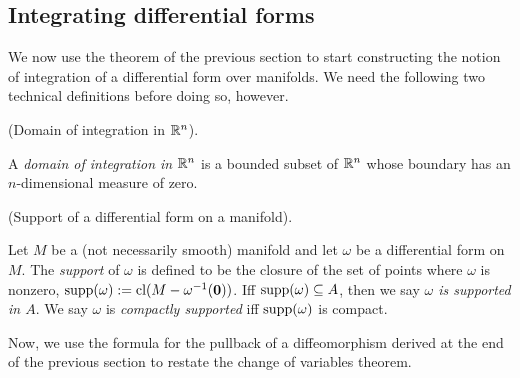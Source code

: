 \subsection*{Integrating differential forms}

We now use the theorem of the previous section to start constructing the notion of integration of a differential form over manifolds. We need the following two technical definitions before doing so, however.

\begin{defn}
     (Domain of integration in $\mathbb{R}^n$).
    
    A \textit{domain of integration in $\mathbb{R}^n$} is a bounded subset of $\mathbb{R}^n$ whose boundary has an $n$-dimensional measure of zero.
\end{defn}

\begin{defn}
     (Support of a differential form on a manifold).
        
    Let $M$ be a (not necessarily smooth) manifold and let $\omega$ be a differential form on $M$. The \textit{support} of $\omega$ is defined to be the closure of the set of points where $\omega$ is nonzero, $\text{supp}(\omega) := \text{cl}(M - \omega^{-1}(\mathbf{0}))$. Iff $\text{supp}(\omega) \subseteq A$, then we say \textit{$\omega$ is supported in $A$}. We say $\omega$ is \textit{compactly supported} iff $\text{supp}(\omega)$ is compact.
\end{defn}

Now, we use the formula for the pullback of a diffeomorphism derived at the end of the previous section to restate the change of variables theorem.

